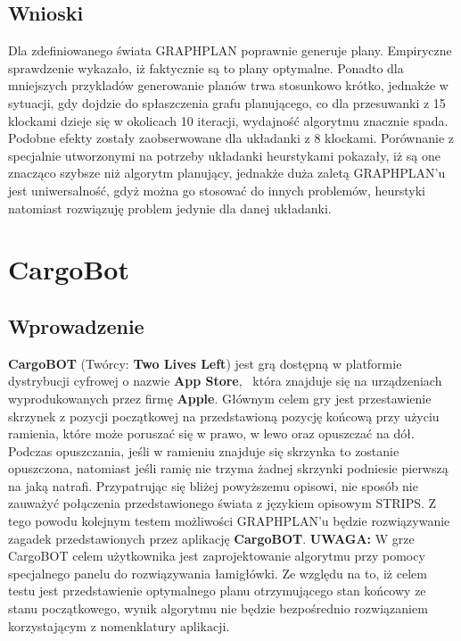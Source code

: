     \subsection{Wnioski}
        Dla zdefiniowanego świata GRAPHPLAN poprawnie generuje plany. Empiryczne sprawdzenie wykazało, iż faktycznie są to plany optymalne. Ponadto 
        dla mniejszych przykladów generowanie planów trwa stosunkowo krótko, jednakże w sytuacji, gdy dojdzie do spłaszczenia grafu planującego, 
        co dla przesuwanki z 15 klockami dzieje się w okolicach 10 iteracji, wydajność algorytmu znacznie spada. Podobne efekty zostały 
        zaobserwowane dla układanki z 8 klockami. Porównanie z specjalnie utworzonymi na potrzeby układanki heurstykami pokazały, iż są one 
        znacząco szybsze niż algorytm planujący, jednakże duża zaletą GRAPHPLAN'u jest uniwersalność, gdyż można go stosować do innych problemów,
        heurstyki natomiast rozwiązuję problem jedynie dla danej układanki.
\section{CargoBot}
\label{CargoBotTest}
    \subsection{Wprowadzenie}
        \textbf{CargoBOT} (Twórcy: \textbf{Two Lives Left}) jest grą dostępną w platformie dystrybucji cyfrowej o nazwie \textbf{App Store}, \
        która znajduje się na urządzeniach wyprodukowanych przez firmę \textbf{Apple}. 
        Głównym celem gry jest przestawienie skrzynek z pozycji początkowej na przedstawioną 
        pozycję końcową przy użyciu ramienia, które może poruszać się w prawo, w lewo oraz opuszczać na dół. Podczas opuszczania, jeśli w 
        ramieniu znajduje się skrzynka to zostanie opuszczona, natomiast jeśli ramię nie trzyma żadnej skrzynki podniesie pierwszą na jaką 
        natrafi. Przypatrując się bliżej powyższemu opisowi, nie sposób nie zauważyć połączenia przedstawionego świata z językiem opisowym 
        STRIPS. Z tego powodu kolejnym testem możliwości GRAPHPLAN'u będzie rozwiązywanie zagadek przedstawionych przez aplikację \textbf{CargoBOT}.
        \textbf{UWAGA: } W grze CargoBOT celem użytkownika jest zaprojektowanie algorytmu przy pomocy specjalnego panelu do rozwiązywania łamigłówki.
        Ze względu na to, iż celem testu jest przedstawienie optymalnego planu otrzymującego stan końcowy ze stanu początkowego, wynik algorytmu 
        nie będzie bezpośrednio rozwiązaniem korzystającym z nomenklatury aplikacji.
